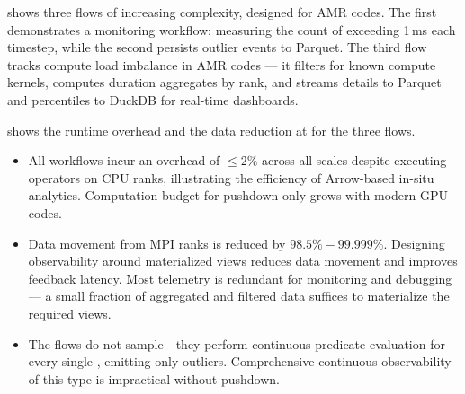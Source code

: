 
 shows three flows of increasing complexity, designed for AMR codes.
The first demonstrates a monitoring workflow: measuring the count of \mpiw{} exceeding 1\,ms each
timestep, while the second persists outlier events to Parquet.
The third flow tracks compute load imbalance in AMR codes --- it filters for known compute kernels,
computes duration aggregates by rank, and streams details to Parquet and percentiles to DuckDB for
real-time dashboards.

\enlargethispage{\baselineskip}

 shows the runtime overhead and the data reduction at \tiermpi{} for the three flows.
\begin{itemize}[leftmargin=*]
  \item
        All workflows incur an overhead of $\le 2\%$ across all scales despite executing
        operators on CPU ranks, illustrating the efficiency of Arrow-based in-situ analytics.
        Computation budget for pushdown only grows with modern GPU codes.
  \item Data movement from MPI ranks is reduced by $98.5\%-99.999\%$.
        Designing observability around materialized views reduces data movement and improves feedback
        latency.
        Most telemetry is redundant for monitoring and debugging --- a small fraction of aggregated and
        filtered data suffices to materialize the required views.
  \item The \mpiw{} flows do not sample---they perform continuous predicate evaluation for every
        single \mpiw{}, emitting only outliers.
        Comprehensive continuous observability of this type is impractical without pushdown.
\end{itemize}



